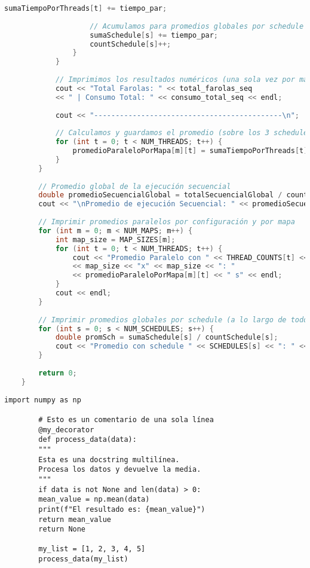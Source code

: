 \documentclass{article}
\begin{document}
\begin{lstlisting}[language=C++, style=cpp-style, caption={Ejemplo de código en C++.}]
					sumaTiempoPorThreads[t] += tiempo_par;
					
					// Acumulamos para promedios globales por schedule (cada prueba cuenta)
					sumaSchedule[s] += tiempo_par;
					countSchedule[s]++;
				}
			}
			
			// Imprimimos los resultados numéricos (una sola vez por mapa, según la versión secuencial)
			cout << "Total Farolas: " << total_farolas_seq
			<< " | Consumo Total: " << consumo_total_seq << endl;
			
			cout << "--------------------------------------------\n";
			
			// Calculamos y guardamos el promedio (sobre los 3 schedules) para cada cantidad de hilos para éste mapa.
			for (int t = 0; t < NUM_THREADS; t++) {
				promedioParaleloPorMapa[m][t] = sumaTiempoPorThreads[t] / NUM_SCHEDULES;
			}
		}
		
		// Promedio global de la ejecución secuencial
		double promedioSecuencialGlobal = totalSecuencialGlobal / countSecuencial;
		cout << "\nPromedio de ejecución Secuencial: " << promedioSecuencialGlobal << " s\n" << endl;
		
		// Imprimir promedios paralelos por configuración y por mapa
		for (int m = 0; m < NUM_MAPS; m++) {
			int map_size = MAP_SIZES[m];
			for (int t = 0; t < NUM_THREADS; t++) {
				cout << "Promedio Paralelo con " << THREAD_COUNTS[t] << " hilos "
				<< map_size << "x" << map_size << ": "
				<< promedioParaleloPorMapa[m][t] << " s" << endl;
			}
			cout << endl;
		}
		
		// Imprimir promedios globales por schedule (a lo largo de todos los mapas y configuraciones)
		for (int s = 0; s < NUM_SCHEDULES; s++) {
			double promSch = sumaSchedule[s] / countSchedule[s];
			cout << "Promedio con schedule " << SCHEDULES[s] << ": " << promSch << " s" << endl;
		}
		
		return 0;
	}	\end{lstlisting}

	\begin{lstlisting}[style=python-style, caption={Ejemplo de código en Python.}]
		import numpy as np
		
		# Esto es un comentario de una sola línea
		@my_decorator
		def process_data(data):
		"""
		Esta es una docstring multilínea.
		Procesa los datos y devuelve la media.
		"""
		if data is not None and len(data) > 0:
		mean_value = np.mean(data)
		print(f"El resultado es: {mean_value}")
		return mean_value
		return None
		
		my_list = [1, 2, 3, 4, 5]
		process_data(my_list)
	\end{lstlisting}

	
\end{document}
